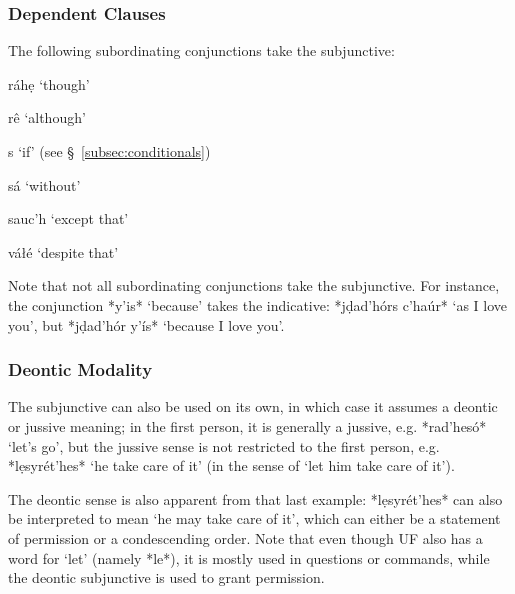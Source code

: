 \documentclass[a4paper, 12pt, oneside, final]{article}
\newlength{\EnumItemSep} \EnumItemSep-3pt
\newenvironment { dlist } [1] [{}] {
    \vspace { -.5em }
    \begingroup
    \def\descriptionlabel ##1 {\hspace\labelsep \normalfont #1 ##1}
    \settowidth \leftmargini { 99.\hskip\labelsep }
    \begin { description }
    \itemsep \EnumItemSep
} {
    \end { description }
    \endgroup
    \vspace { -.5em }
}
\begin{document}
\subsubsection{Dependent Clauses}
The following subordinating conjunctions take the subjunctive:
 {
\begin{dlist}[\bfseries\itshape]
    \item[ráhẹ] ‘though’
    \item[rê] ‘although’
    \item[s] ‘if’ (see §~\ref{subsec:conditionals})
    \item[sá] ‘without’
    \item[sauc’h] ‘except that’
    \item[váłé] ‘despite that’
\end{dlist}
}

\noindent Note that not all subordinating conjunctions take the subjunctive. For instance, the conjunction *y’is*
‘because’ takes the indicative: *jḍad’hórs c’haúr* ‘as I love you’, but *jḍad’hór y’ís* ‘because I love you’.

\subsubsection{Deontic Modality}
The subjunctive can also be used on its own, in which case it assumes a deontic or jussive meaning;
in the first person, it is generally a jussive, e.g. *rad’hesó* ‘let’s go’, but the jussive sense is not restricted
to the first person, e.g. *lẹsyrét’hes* ‘he take care of it’ (in the sense of ‘let him take care of it’).

The deontic sense is also apparent from that last example: *lẹsyrét’hes* can also be interpreted to mean ‘he
may take care of it’, which can either be a statement of permission or a condescending order. Note that even
though UF also has a word for ‘let’ (namely *le*), it is mostly used in questions or commands, while the
deontic subjunctive is used to grant permission.
\end{document}
